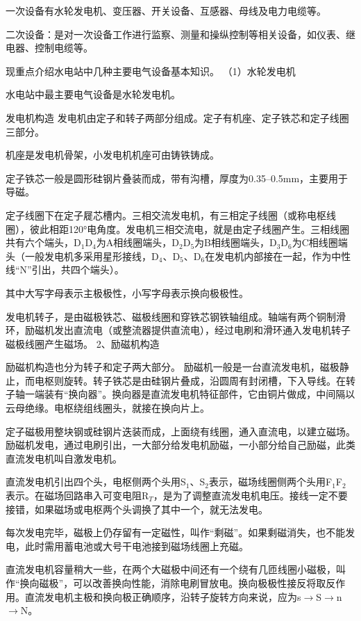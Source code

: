 \documentclass{ctexbook}
\begin{document}
一次设备有水轮发电机、变压器、开关设备、互感器、母线及电力电缆等。

二次设备：是对一次设备工作进行监察、测量和操纵控制等相关设备，如仪表、继电器、控制电缆等。

现重点介绍水电站中几种主要电气设备基本知识。
（1）水轮发电机

水电站中最主要电气设备是水轮发电机。

发电机构造
发电机由定子和转子两部分组成。定子有机座、定子铁芯和定子线圈三部分。

机座是发电机骨架，小发电机机座可由铸铁铸成。

定子铁芯一般是圆形硅钢片叠装而成，带有沟槽，厚度为0.35--0.5mm，主要用于导磁。

定子线圈下在定子屣芯槽内。三相交流发电机，有三相定子线圈（或称电枢线圈），彼此相距120°电角度。发电机三相交流电，就是由定子线圈产生。三相线圈共有六个端头，D$_1$D$_4$为A相线圈端头，D$_2$D$_5$为B相线圈端头，D$_3$D$_6$为C相线圈端头（一般发电机多采用星形接线，D$_4$、D$_5$、D$_6$在发电机内部接在一起，作为中性线“N”引出，共四个端头）。

其中大写字母表示主极极性，小写字母表示换向极极性。

发电机转子，是由磁极铁芯、磁极线圈和穿铁芯钢铁轴组成。轴端有两个铜制滑环，励磁机发出直流电（或整流器提供直流电），经过电刷和滑环通入发电机转子磁极线圈产生磁场。
2、励磁机构造

励磁机构造也分为转子和定子两大部分。
励磁机一般是一台直流发电机，磁极静止，而电枢则旋转。转子铁芯是由硅钢片叠成，沿圆周有封闭槽，下入导线。在转子轴一端装有“换向器”。换向器是直流发电机特征部件，它由铜片做成，中间隔以云母绝缘。电枢绕组线圈头，就接在换向片上。

定子磁极用整块钢或硅钢片迭装而成，上面绕有线圈，通入直流电，以建立磁场。励磁机发电，通过电刷引出，一大部分给发电机励磁，一小部分给自己励磁，此类直流发电机叫自激发电机。

直流发电机引出四个头，电枢侧两个头用S$_1$、S$_2$表示，磁场线圈侧两个头用F$_1$F$_2$表示。在磁场回路串入可变电阻R$_T$，是为了调整直流发电机电压。接线一定不要接错，如果磁场或电枢两个头调换了其中一个，就无法发电。

每次发电完毕，磁极上仍存留有一定磁性，叫作“剩磁”。如果剩磁消失，也不能发电，此时需用蓄电池或大号干电池接到磁场线圈上充磁。

直流发电机容量稍大一些，在两个大磁极中间还有一个绕有几匝线圈小磁极，叫作“换向磁极”，可以改善换向性能，消除电刷冒放电。换向极极性接反将取反作用。直流发电机主极和换向极正确顺序，沿转子旋转方向来说，应为s$\to$S$\to$n$\to$N。
\end{document}
